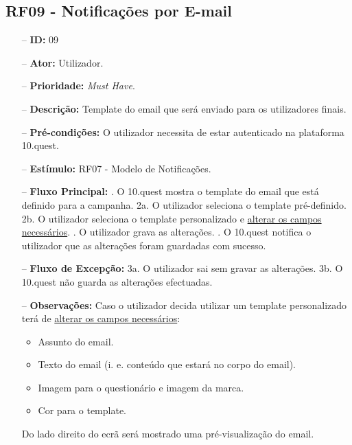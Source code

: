 \subsection{RF09 - Notificações por E-mail}
\begin{itemize}
	\item[--] \textbf{ID:} 09
	\item[--]  \textbf{Ator:} Utilizador.
	\item[--]  \textbf{Prioridade:} \textit{Must Have}.
	\item[--]  \textbf{Descrição:} Template do email que será enviado para os utilizadores finais.
	\item[--]  \textbf{Pré-condições:} O utilizador necessita de estar autenticado na plataforma 10.quest.
	\item[--]  \textbf{Estímulo:} RF07 - Modelo de Notificações.
	\item[--]  \textbf{Fluxo Principal:} 
	. O 10.quest mostra o template do email que está definido para a campanha.
	\subitem 2a. O utilizador seleciona o template pré-definido.
	\subitem 2b. O utilizador seleciona o template personalizado e \underline{alterar os campos necessários}.
	. O utilizador grava as alterações.
	. O 10.quest notifica o utilizador que as alterações foram guardadas com sucesso.
	\item[--]  \textbf{Fluxo de Excepção:} 
	\subitem 3a. O utilizador sai sem gravar as alterações.
	\subitem 3b. O 10.quest não guarda as alterações efectuadas.
	\item[--]  \textbf{Observações:} Caso o utilizador decida utilizar um template personalizado terá de \underline{alterar os campos necessários}:
	\begin{itemize}
		\item Assunto do email.
		\item Texto do email (i. e. conteúdo que estará no corpo do email).
		\item Imagem para o questionário e imagem da marca.
		\item Cor para o template.
	\end{itemize}
	Do lado direito do ecrã será mostrado uma pré-visualização do email.
\end{itemize}
\newpage

